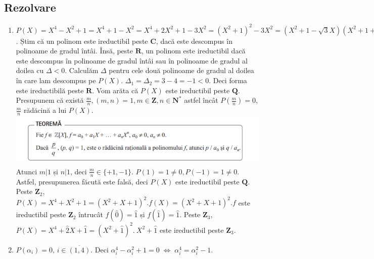 \documentclass{article}
\DeclareRobustCommand\iff{\;\Longleftrightarrow\;}
\begin{document}
\subsection{Rezolvare}
\begin{enumerate}
    \item $P(X) = X^4 - X^2 + 1 = X^4 + 1 - X^2 = X^4 + 2X^2 + 1 - 3X^2 = (X^2 + 1)^2 - 3X^2 = (X^2 + 1 - \sqrt{3}X)(X^2 + 1 + \sqrt{3}X)$.\newline
    Știm că un polinom este ireductibil peste $\mathbf{C}$, dacă este descompus în polinoame de gradul întâi. Însă, peste $\mathbf{R}$, un polinom este ireductibil dacă este descompus în polinoame de gradul întâi sau în polinoame de gradul al doilea cu $\Delta < 0$. \newline
    Calculăm $\Delta$ pentru cele două polinoame de gradul al doilea în care lam descompus pe $P(X)$. $\Delta_1 = \Delta_2 =  3 - 4 = -1 < 0$. Deci forma este ireductibilă peste $\mathbf{R}$. \newline
    Vom arăta că $P(X)$ este ireductibil peste $\mathbf{Q}$. Presupunem că există $\frac{m}{n}, (m, n) = 1, m \in \mathbf{Z}, n \in \mathbf{N}^*$ astfel încât $P(\frac{m}{n}) = 0$, $\frac{m}{n}$ rădăcină a lui $P(X)$. \newline
    \includegraphics[width = \textwidth]{teorema.PNG}
    \newline
    Atunci $m|1$ și $n|1$, deci $\frac{m}{n} \in \{+1, -1\}$. \newline
    $P(1) = 1 \neq 0, P(-1) = 1 \neq 0$. Astfel, presupunerea făcută este falsă, deci $P(X)$ este ireductibil peste $\mathbf{Q}$. \newline
    Peste $\mathbf{Z}_2$, $P(X) = X^4 + X^2 + 1 = (X^2 + X + 1)^2. f(X) = (X^2 + X + 1)^2. f$ este ireductibil peste $\mathbf{Z}_2$ întrucât $f(\widehat{0}) = \widehat{1}$ și $f(\widehat{1}) = \widehat{1}$. \newline
    Peste $\mathbf{Z}_3$, $P(X) = X^4 + \widehat{2}X + \widehat{1} = (X^2 + \widehat{1})^2. \ X^2 + \widehat{1}$ este ireductibil peste $\mathbf{Z}_3$.  
    \item $P(\alpha_i) = 0, \, i \in \overline{(1, 4)}.$ Deci $\alpha_i^4 - \alpha_i^2 + 1 = 0 \iff \alpha_i^4 = \alpha_i^2 - 1$. \newline

\end{enumerate}
\end{document}
